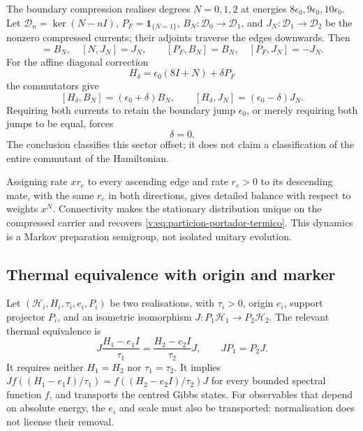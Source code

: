The boundary compression realises degrees $N=0,1,2$ at energies
$8\epsilon_0,9\epsilon_0,10\epsilon_0$. Let
$\mathcal D_n=\ker(N-nI)$,
$P_F=\mathbf1_{\{N=1\}}$,
$B_N:\mathcal D_0\to\mathcal D_1$, and
$J_N:\mathcal D_1\to\mathcal D_2$ be the nonzero compressed currents;
their adjoints traverse the edges downwards. Then
\begin{equation}
 [N,B_N]=B_N,\quad [N,J_N]=J_N,\qquad
 [P_F,B_N]=B_N,\quad [P_F,J_N]=-J_N.
 \label{v:eq:conmutadores-corrientes-termicas}
\end{equation}
For the affine diagonal correction
\[
 H_\delta=\epsilon_0(8I+N)+\delta P_F
\]
the commutators give
\[
 [H_\delta,B_N]=(\epsilon_0+\delta)B_N,
 \qquad
 [H_\delta,J_N]=(\epsilon_0-\delta)J_N.
\]
Requiring both currents to retain the boundary jump $\epsilon_0$, or merely
requiring both jumps to be equal, forces
\begin{equation}
 \delta=0.
 \label{v:eq:rigidez-desfase-corrientes}
\end{equation}
The conclusion classifies this sector offset; it does not claim a
classification of the entire commutant of the Hamiltonian.

Assigning rate $xr_e$ to every ascending edge and rate $r_e>0$ to its
descending mate, with the same $r_e$ in both directions, gives detailed
balance with respect to weights $x^N$. Connectivity makes the stationary
distribution unique on the compressed carrier and recovers
\eqref{v:eq:particion-portador-termico}. This dynamics is a Markov preparation
semigroup, not isolated unitary evolution.

\subsection{Thermal equivalence with origin and marker}

Let $(\mathscr H_i,H_i,\tau_i,e_i,P_i)$ be two realisations, with
$\tau_i>0$, origin $e_i$, support projector $P_i$, and an isometric
isomorphism $J:P_1\mathscr H_1\to P_2\mathscr H_2$. The relevant thermal
equivalence is
\begin{equation}
 J\frac{H_1-e_1I}{\tau_1}
 =\frac{H_2-e_2I}{\tau_2}J,\qquad JP_1=P_2J.
 \label{v:eq:equivalencia-termica-centrada}
\end{equation}
It requires neither $H_1=H_2$ nor $\tau_1=\tau_2$. It implies
$Jf((H_1-e_1I)/\tau_1)=f((H_2-e_2I)/\tau_2)J$ for every bounded spectral
function $f$, and transports the centred Gibbs states. For observables that
depend on absolute energy, the $e_i$ and scale must also be transported:
normalisation does not license their removal.

